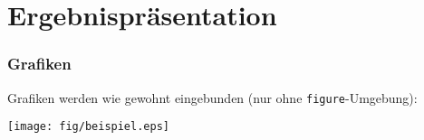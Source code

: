 \section{Ergebnispräsentation}

\begin{frame}
  \frametitle{Grafiken}
  Grafiken werden wie gewohnt eingebunden (nur ohne \texttt{figure}-Umgebung):
  \begin{center}
    \texttt{[image: fig/beispiel.eps]}
  \end{center}
\end{frame}
